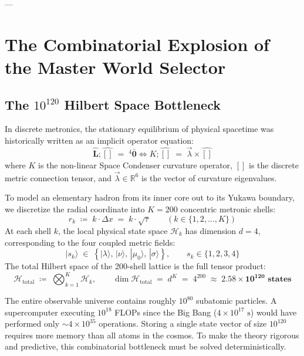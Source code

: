 \documentclass[
    12pt,
    a4paper,
    headings=normal,
    twoside=false,
    open=any,
    parskip=half
]{scrbook}
\begin{document}
---

\section{The Combinatorial Explosion of the Master World Selector}
\label{sec:ch4_combinatorial_crisis}

\subsection{The $10^{120}$ Hilbert Space Bottleneck}

In discrete metronics, the stationary equilibrium of physical spacetime was historically written as an implicit operator equation:
\begin{equation}
\hat{\mathbf{L}} ; \hat{\mathbf{[]}} \;=\; {}^4\bar{\mathbf{0}} \iff K ; \hat{\mathbf{[]}} \;=\; \vec{\lambda} \times \hat{\mathbf{[]}}
\label{eq:ch4_master_selector_recap}
\end{equation}
where $K$ is the non-linear Space Condenser curvature operator, $\hat{\mathbf{[]}}$ is the discrete metric connection tensor, and $\vec{\lambda} \in \mathbb{R}^6$ is the vector of curvature eigenvalues.

To model an elementary hadron from its inner core out to its Yukawa boundary, we discretize the radial coordinate into $K = 200$ concentric metronic shells:
\begin{equation}
r_k \;\coloneqq\; k \cdot \Delta x \;=\; k \cdot \sqrt{\tau} \qquad (k \in \{1, 2, \dots, K\})
\label{eq:ch4_radial_shells_def}
\end{equation}
At each shell $k$, the local physical state space $\mathcal{H}_k$ has dimension $d = 4$, corresponding to the four coupled metric fields:
\begin{equation}
|s_k\rangle \;\in\; \left\{ |\lambda\rangle, \, |\nu\rangle, \, |\mu_0\rangle, \, |\sigma\rangle \right\}, \qquad s_k \in \{1, 2, 3, 4\}
\label{eq:ch4_local_hilbert_states}
\end{equation}
The total Hilbert space of the 200-shell lattice is the full tensor product:
\begin{equation}
\mathcal{H}_{\text{total}} \;\coloneqq\; \bigotimes_{k=1}^K \mathcal{H}_k, \qquad \dim \mathcal{H}_{\text{total}} \;=\; d^K \;=\; 4^{200} \;\approx\; \mathbf{2.58 \times 10^{120} \text{ states}}
\label{eq:ch4_combinatorial_number}
\end{equation}

\begin{intuitionbox}
The entire observable universe contains roughly $10^{80}$ subatomic particles. A supercomputer executing $10^{18}$ FLOPs since the Big Bang ($4 \times 10^{17}\text{ s}$) would have performed only $\sim 4 \times 10^{35}$ operations. Storing a single state vector of size $10^{120}$ requires more memory than all atoms in the cosmos. To make the theory rigorous and predictive, this combinatorial bottleneck must be solved deterministically.
\end{intuitionbox}
\end{document}
